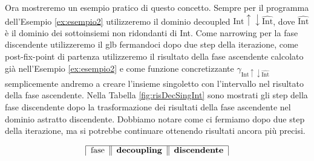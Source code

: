 \begin{example}
Ora mostreremo un esempio pratico di questo concetto. Sempre per il programma dell'Esempio \ref{ex:esempio2} utilizzeremo il dominio decoupled \(\textrm{Int}\uparrow\downarrow\widehat{\textrm{Int}}\), dove \(\widehat{\textrm{Int}}\) è il dominio dei sottoinsiemi non ridondanti di Int. Come narrowing per la fase discendente utilizzeremo il glb fermandoci dopo due step della iterazione, come post-fix-point di partenza utilizzeremo il risultato della fase ascendente calcolato già nell'Esempio \ref{ex:esempio2} e come funzione concretizzante \(\gamma_{\textrm{Int}\uparrow\downarrow\widehat{\textrm{Int}}}\) semplicemente andremo a creare l'insieme singoletto con l'intervallo nel risultato della fase ascendente. Nella Tabella \ref{fig:risDecSingInt} sono mostrati gli step della fase discendente dopo la trasformazione dei risultati della fase ascendente nel dominio astratto discendente. Dobbiamo notare come ci fermiamo dopo due step della iterazione, ma si potrebbe continuare ottenendo risultati ancora più precisi. 

\begin{table}[H]
\begin{minipage}{\textwidth}
    \centering
    \vspace{1cm}
        \[
        \begin{tabular}{|c||c||c|c|}
        \hline
        \multicolumn{1}{|c||}{fase} & 
        \multicolumn{1}{c||}{\textbf{decoupling}} & 
        \multicolumn{2}{c|}{\textbf{discendente}}\\
        

\end{tabular}\]
\end{minipage}
\end{table}
\end{example}
